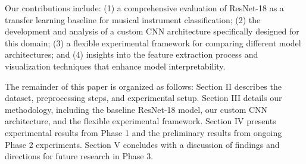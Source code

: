 Our contributions include: (1) a comprehensive evaluation of ResNet-18 as a transfer learning baseline for musical instrument classification; (2) the development and analysis of a custom CNN architecture specifically designed for this domain; (3) a flexible experimental framework for comparing different model architectures; and (4) insights into the feature extraction process and visualization techniques that enhance model interpretability.

The remainder of this paper is organized as follows: Section II describes the dataset, preprocessing steps, and experimental setup. Section III details our methodology, including the baseline ResNet-18 model, our custom CNN architecture, and the flexible experimental framework. Section IV presents experimental results from Phase 1 and the preliminary results from ongoing Phase 2 experiments. Section V concludes with a discussion of findings and directions for future research in Phase 3.
